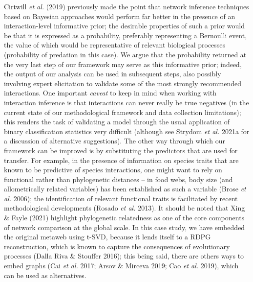 \documentclass[11pt]{article}
\begin{document}
Cirtwill \emph{et al.} (2019) previously made the point that network
inference techniques based on Bayesian approaches would perform far
better in the presence of an interaction-level informative prior; the
desirable properties of such a prior would be that it is expressed as a
probability, preferably representing a Bernoulli event, the value of
which would be representative of relevant biological processes
(probability of predation in this case). We argue that the probability
returned at the very last step of our framework may serve as this
informative prior; indeed, the output of our analysis can be used in
subsequent steps, also possibly involving expert elicitation to validate
some of the most strongly recommended interactions. One important
\emph{caveat} to keep in mind when working with interaction inference is
that interactions can never really be true negatives (in the current
state of our methodological framework and data collection limitations);
this renders the task of validating a model through the usual
application of binary classification statistics very difficult (although
see Strydom \emph{et al.} 2021a for a discussion of alternative
suggestions). The other way through which our framework can be improved
is by substituting the predictors that are used for transfer. For
example, in the presence of information on species traits that are known
to be predictive of species interactions, one might want to rely on
functional rather than phylogenetic distances -- in food webs, body size
(and allometrically related variables) has been established as such a
variable (Brose \emph{et al.} 2006); the identification of relevant
functional traits is facilitated by recent methodological developments
(Rosado \emph{et al.} 2013). It should be noted that Xing \& Fayle
(2021) highlight phylogenetic relatedness as one of the core components
of network comparison at the global scale. In this case study, we have
embedded the original metaweb using t-SVD, because it lends itself to a
RDPG reconstruction, which is known to capture the consequences of
evolutionary processes (Dalla Riva \& Stouffer 2016); this being said,
there are others ways to embed graphs (Cai \emph{et al.} 2017; Arsov \&
Mirceva 2019; Cao \emph{et al.} 2019), which can be used as
alternatives.
\end{document}
